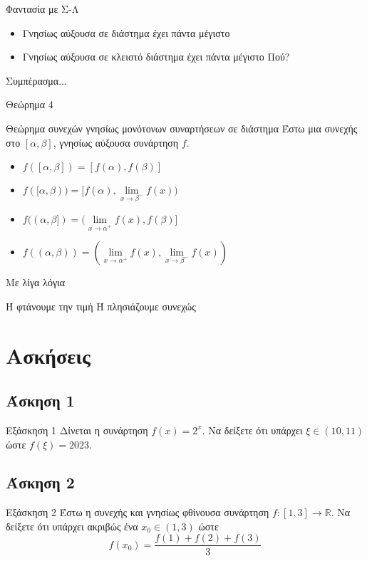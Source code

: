\documentclass[greek]{beamer}
\begin{document}
\begin{frame}{Φαντασία με Σ-Λ}
      \begin{itemize}
            \item<1-> Γνησίως αύξουσα σε διάστημα έχει πάντα μέγιστο
            \item<2-> Γνησίως αύξουσα σε κλειστό διάστημα έχει πάντα μέγιστο  Πού?
      \end{itemize}
      Συμπέρασμα...
\end{frame}

\begin{frame}{Θεώρημα 4}
      \begin{block}{Θεώρημα συνεχών γνησίως μονότονων συναρτήσεων σε διάστημα}
            Έστω μια συνεχής στο $[α,β]$, γνησίως αύξουσα συνάρτηση $f$.
            \begin{itemize}
                  \item<1-> $f([α,β])=[f(α),f(β)]$
                  \item<2-> $f([α,β))=[f(α),\lim\limits_{x \to β^-}{ f(x) })$
                  \item<3-> $f((α,β])=(\lim\limits_{x \to α^+}{ f(x) },f(β)]$
                  \item<4-> $f((α,β))=(\lim\limits_{x \to α^+}{ f(x) },\lim\limits_{x \to β^-}{ f(x) })$
            \end{itemize}
      \end{block}
      Με λίγα λόγια

      Ή φτάνουμε την τιμή Ή πλησιάζουμε συνεχώς
\end{frame}

\section{Ασκήσεις}
\subsection{Άσκηση 1}
\begin{frame}[label=Άσκηση1]{Εξάσκηση 1}
      Δίνεται η συνάρτηση $f(x)=2^x$. Να δείξετε ότι υπάρχει $ξ\in (10,11)$ ώστε $f(ξ)=2023$.

      \hyperlink{Λύση1}{}
\end{frame}

\subsection{Άσκηση 2}
\begin{frame}[label=Άσκηση2]{Εξάσκηση 2}
      Έστω η συνεχής και γνησίως φθίνουσα συνάρτηση $f:[1,3]\to\mathbb{R}$. Να δείξετε ότι υπάρχει ακριβώς ένα $x_0\in (1,3)$ ώστε
      $$f(x_0)=\frac{f(1)+f(2)+f(3)}{3}$$

      \hyperlink{Λύση2}{}
\end{frame}
\end{document}
